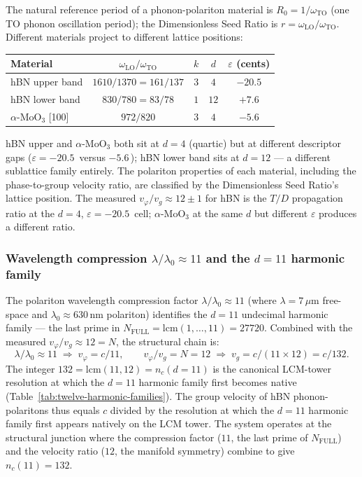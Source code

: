 \documentclass[11pt,a4paper]{article}
\theoremstyle{definition}
\theoremstyle{remark}
\begin{document}
The natural reference period of a phonon-polariton material is $R_{0} = 1/\omega_{\mathrm{TO}}$ (one TO phonon oscillation period); the Dimensionless Seed Ratio is $r = \omega_{\mathrm{LO}}/\omega_{\mathrm{TO}}$. Different materials project to different lattice positions:
\begin{center}
\begin{tabular}{@{}l c c c c@{}}
\toprule
Material & $\omega_{\mathrm{LO}}/\omega_{\mathrm{TO}}$ & $k$ & $d$ & $\varepsilon$ (cents)\\
\midrule
hBN upper band & $1610/1370 = 161/137$ & $3$ & $4$ & $-20.5$\\
hBN lower band & $830/780 = 83/78$ & $1$ & $12$ & $+7.6$\\
$\alpha$-MoO$_{3}$ [100] & $972/820$ & $3$ & $4$ & $-5.6$\\
\bottomrule
\end{tabular}
\end{center}
hBN upper and $\alpha$-MoO$_{3}$ both sit at $d=4$ (quartic) but at different descriptor gaps ($\varepsilon = -20.5$\,\textcent{} versus $-5.6$\,\textcent); hBN lower band sits at $d=12$ --- a different sublattice family entirely. The polariton properties of each material, including the phase-to-group velocity ratio, are classified by the Dimensionless Seed Ratio's lattice position. The measured $v_{\varphi}/v_{g} \approx 12 \pm 1$ for hBN is the $T/D$ propagation ratio at the $d=4$, $\varepsilon=-20.5$\,\textcent{} cell; $\alpha$-MoO$_{3}$ at the same $d$ but different $\varepsilon$ produces a different ratio.

\subsubsection*{Wavelength compression $\lambda/\lambda_{0} \approx 11$ and the $d=11$ harmonic family}

The polariton wavelength compression factor $\lambda/\lambda_{0} \approx 11$ (where $\lambda = 7\,\mu$m free-space and $\lambda_{0} \approx 630$\,nm polariton) identifies the $d=11$ undecimal harmonic family --- the last prime in $N_{\mathrm{FULL}} = \mathrm{lcm}(1,\ldots,11) = 27720$. Combined with the measured $v_{\varphi}/v_{g} \approx 12 = N$, the structural chain is:
\[
\lambda/\lambda_{0} \approx 11 \;\Rightarrow\; v_{\varphi} = c/11, \qquad v_{\varphi}/v_{g} = N = 12 \;\Rightarrow\; v_{g} = c/(11\times 12) = c/132.
\]
The integer $132 = \mathrm{lcm}(11,12) = n_{c}(d{=}11)$ is the canonical LCM-tower resolution at which the $d=11$ harmonic family first becomes native (Table~\ref{tab:twelve-harmonic-families}). The group velocity of hBN phonon-polaritons thus equals $c$ divided by the resolution at which the $d=11$ harmonic family first appears natively on the LCM tower. The system operates at the structural junction where the compression factor ($11$, the last prime of $N_{\mathrm{FULL}}$) and the velocity ratio ($12$, the manifold symmetry) combine to give $n_{c}(11) = 132$.
\end{document}
